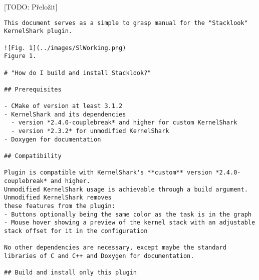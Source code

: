 [TODO: Přeložit]
\begin{verbatim}
This document serves as a simple to grasp manual for the "Stacklook" KernelShark plugin.

![Fig. 1](../images/SlWorking.png)
Figure 1.

# "How do I build and install Stacklook?"

## Prerequisites

- CMake of version at least 3.1.2
- KernelShark and its dependencies
  - version *2.4.0-couplebreak* and higher for custom KernelShark
  - version *2.3.2* for unmodified KernelShark
- Doxygen for documentation

## Compatibility

Plugin is compatible with KernelShark's **custom** version *2.4.0-couplebreak* and higher.
Unmodified KernelShark usage is achievable through a build argument. Unmodified KernelShark removes
these features from the plugin:
- Buttons optionally being the same color as the task is in the graph
- Mouse hover showing a preview of the kernel stack with an adjustable stack offset for it in the configuration

No other dependencies are necessary, except maybe the standard libraries of C and C++ and Doxygen for documentation. 

## Build and install only this plugin


\end{verbatim}
